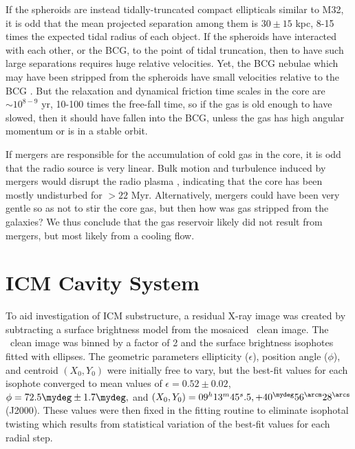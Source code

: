 \documentclass[useAMS,usenatbib]{mn2e}
\begin{document}
If the spheroids are instead tidally-truncated compact ellipticals
similar to M32, it is odd that the mean projected separation among
them is $30 \pm 15$ kpc, 8-15 times the expected tidal radius of each
object. If the spheroids have interacted with each other, or the BCG,
to the point of tidal truncation, then to have such large separations
requires huge relative velocities. Yet, the BCG nebulae which may have
been stripped from the spheroids have small velocities relative to the
BCG \citep{1996MNRAS.283.1003C}. But the relaxation and dynamical
friction time scales in the core are $\sim 10^{8-9}$ yr, 10-100 times
the free-fall time, so if the gas is old enough to have slowed, then
it should have fallen into the BCG, unless the gas has high angular
momentum or is in a stable orbit.

If mergers are responsible for the accumulation of cold gas in the
core, it is odd that the radio source is very linear. Bulk motion and
turbulence induced by mergers would disrupt the radio plasma
\citep[\eg][]{2009A&A...495..721S, 2010arXiv1002.0395S}, indicating
that the core has been mostly undisturbed for $> 22$
Myr. Alternatively, mergers could have been very gentle so as not to
stir the core gas, but then how was gas stripped from the galaxies?
We thus conclude that the gas reservoir likely did not result from
mergers, but most likely from a cooling flow.

\section{ICM Cavity System}
\label{sec:cavs}

To aid investigation of ICM substructure, a residual X-ray image was
created by subtracting a surface brightness model from the mosaiced
\chandra\ clean image. The \chandra\ clean image was binned by a
factor of 2 and the surface brightness isophotes fitted with
ellipses. The geometric parameters ellipticity ($\epsilon$), position
angle ($\phi$), and centroid $(X_0,Y_0)$ were initially free to vary,
but the best-fit values for each isophote converged to mean values of
$\epsilon = 0.52 \pm 0.02$, $\phi = 72.5\mydeg \pm 1.7\mydeg,$ and
$(X_0,Y_0) = \ellradec$ (J2000). These values were then fixed in the
fitting routine to eliminate isophotal twisting which results from
statistical variation of the best-fit values for each radial step.
\end{document}
